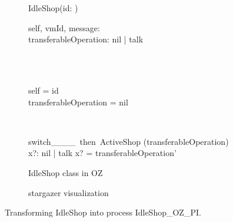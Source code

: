 \begin{figure}[H]
\begin{subfigure}{.6\textwidth}
\centering
\begin{class}{IdleShop(id: \integer)}
\\
\begin{state}
self, vmId, message: \integer
\\transferableOperation: nil | talk
\end{state} 
\\
\begin{init}
\\self = id
\\transferableOperation = nil
\end{init} 
\\
\begin{op}{switch\_\_\_\_\ then\ ActiveShop}
\Delta (transferableOperation)
\\x?: nil | talk
\ST
x? = transferableOperation'
\end{op}
\end{class}
  \caption{IdleShop class in OZ}
\end{subfigure}%
\begin{subfigure}{.4\textwidth}
  \centering
{}
  \caption{stargazer visualization}
\end{subfigure}
\caption{Transforming IdleShop into \picalc{} process IdleShop\_OZ\_PI.}
\label{tra_idleShop_OZ}
\end{figure}

